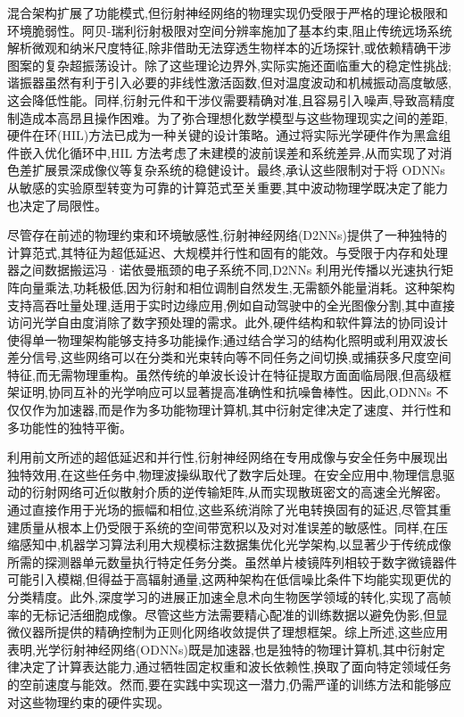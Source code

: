 混合架构扩展了功能模式,但衍射神经网络的物理实现仍受限于严格的理论极限和环境脆弱性。阿贝-瑞利衍射极限对空间分辨率施加了基本约束,阻止传统远场系统解析微观和纳米尺度特征,除非借助无法穿透生物样本的近场探针,或依赖精确干涉图案的复杂超振荡设计。除了这些理论边界外,实际实施还面临重大的稳定性挑战;谐振器虽然有利于引入必要的非线性激活函数,但对温度波动和机械振动高度敏感,这会降低性能。同样,衍射元件和干涉仪需要精确对准,且容易引入噪声,导致高精度制造成本高昂且操作困难。为了弥合理想化数学模型与这些物理现实之间的差距,硬件在环(HIL)方法已成为一种关键的设计策略。通过将实际光学硬件作为黑盒组件嵌入优化循环中,HIL 方法考虑了未建模的波前误差和系统差异,从而实现了对消色差扩展景深成像仪等复杂系统的稳健设计。最终,承认这些限制对于将 ODNNs 从敏感的实验原型转变为可靠的计算范式至关重要,其中波动物理学既决定了能力也决定了局限性。\citep{doi_10_3390_nano14080697_c372a140} \citep{doi_10_1364_oe_461549_b2d41b3f} \citep{doi_10_1117_1_ap_6_5_056004_3f240d06}

尽管存在前述的物理约束和环境敏感性,衍射神经网络(D2NNs)提供了一种独特的计算范式,其特征为超低延迟、大规模并行性和固有的能效。与受限于内存和处理器之间数据搬运冯 \(\cdot\) 诺依曼瓶颈的电子系统不同,D2NNs 利用光传播以光速执行矩阵向量乘法,功耗极低,因为衍射和相位调制自然发生,无需额外能量消耗。这种架构支持高吞吐量处理,适用于实时边缘应用,例如自动驾驶中的全光图像分割,其中直接访问光学自由度消除了数字预处理的需求。此外,硬件结构和软件算法的协同设计使得单一物理架构能够支持多功能操作;通过结合学习的结构化照明或利用双波长差分信号,这些网络可以在分类和光束转向等不同任务之间切换,或捕获多尺度空间特征,而无需物理重构。虽然传统的单波长设计在特征提取方面面临局限,但高级框架证明,协同互补的光学响应可以显著提高准确性和抗噪鲁棒性。因此,ODNNs 不仅仅作为加速器,而是作为多功能物理计算机,其中衍射定律决定了速度、并行性和多功能性的独特平衡。\citep{doi_10_48550_arxiv_2602_07717_16cb1c7a} \citep{doi_10_1364_prj_576203_ae347fba} \citep{doi_10_1038_s41467_022_28702_0_1b79b43c} \citep{doi_10_1002_lpor_202500433_c50e8d3b} \citep{doi_10_1364_oe_598903_731aaac1} \citep{doi_10_1364_ol_591818_8738c4b1}

利用前文所述的超低延迟和并行性,衍射神经网络在专用成像与安全任务中展现出独特效用,在这些任务中,物理波操纵取代了数字后处理。在安全应用中,物理信息驱动的衍射网络可近似散射介质的逆传输矩阵,从而实现散斑密文的高速全光解密。通过直接作用于光场的振幅和相位,这些系统消除了光电转换固有的延迟,尽管其重建质量从根本上仍受限于系统的空间带宽积以及对对准误差的敏感性。同样,在压缩感知中,机器学习算法利用大规模标注数据集优化光学架构,以显著少于传统成像所需的探测器单元数量执行特定任务分类。虽然单片棱镜阵列相较于数字微镜器件可能引入模糊,但得益于高辐射通量,这两种架构在低信噪比条件下均能实现更优的分类精度。此外,深度学习的进展正加速全息术向生物医学领域的转化,实现了高帧率的无标记活细胞成像。尽管这些方法需要精心配准的训练数据以避免伪影,但显微仪器所提供的精确控制为正则化网络收敛提供了理想框架。综上所述,这些应用表明,光学衍射神经网络(ODNNs)既是加速器,也是独特的物理计算机,其中衍射定律决定了计算表达能力,通过牺牲固定权重和波长依赖性,换取了面向特定领域任务的空前速度与能效。然而,要在实践中实现这一潜力,仍需严谨的训练方法和能够应对这些物理约束的硬件实现。\citep{doi_10_1117_1_apn_5_1_016010_3e30c230} \citep{doi_10_1117_1_oe_59_5_051404_363a991a} \citep{doi_10_1038_s41377_019_0196_0_c541a42e}

